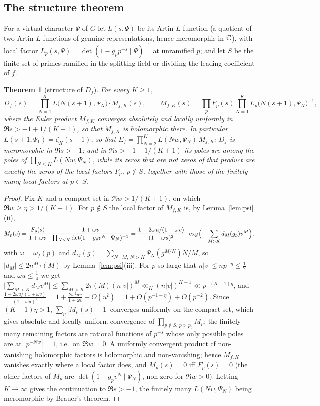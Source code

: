 \documentclass[11pt,a4paper]{article}
\newtheorem{theorem}{Theorem}
\theoremstyle{remark}\newtheorem{remark}[theorem]{Remark}
\begin{document}
\subsection{The structure theorem}

For a virtual character $\Psi$ of $G$ let $L(s,\Psi)$ be its Artin $L$-function (a quotient of two
Artin $L$-functions of genuine representations, hence meromorphic in $\mathbb{C}$), with local factor
$L_p(s,\Psi)=\det(1-g_pp^{-s}\mid\Psi)^{-1}$ at unramified $p$; and let $S$ be the finite set of primes
ramified in the splitting field or dividing the leading coefficient of $f$.

\begin{theorem}[structure of $D_f$]\label{thm:structure}
For every $K\ge1$,
\begin{equation}\label{eq:structure}
D_f(s)=\prod_{N=1}^{K}L\bigl(N(s+1),\Psi_N\bigr)\cdot M_{f,K}(s),\qquad
M_{f,K}(s)=\prod_pF_p(s)\prod_{N=1}^{K}L_p\bigl(N(s+1),\Psi_N\bigr)^{-1},
\end{equation}
where the Euler product $M_{f,K}$ converges absolutely and locally uniformly in $\Re s>-1+1/(K+1)$, so
that $M_{f,K}$ is holomorphic there. In particular $L(s+1,\Psi_1)=\zeta_K(s+1)$, so that
$E_f=\prod_{N=2}^KL(Nw,\Psi_N)\,M_{f,K}$; $D_f$ is meromorphic in $\Re s>-1$; and in
$\Re s>-1+1/(K+1)$ its poles are among the poles of $\prod_{N\le K}L(Nw,\Psi_N)$, while its zeros that are not
zeros of that product are exactly the zeros of the local factors $F_p$, $p\notin S$, together with those
of the finitely many local factors at $p\in S$.
\end{theorem}
\begin{proof}
Fix $K$ and a compact set in $\Re w>1/(K+1)$, on which $\Re w\ge\eta>1/(K+1)$. For $p\notin S$ the local
factor of $M_{f,K}$ is, by Lemma~\ref{lem:psi}(ii),
\[
M_p(s)=\frac{F_p(s)}{1+\omega v}\cdot\frac{1+\omega v}{\prod_{N\le K}\det(1-g_pv^N\mid\Psi_N)^{-1}}
=\frac{1-2\omega u/(1+\omega v)}{(1-\omega u)^2}\cdot\exp\Bigl(-\sum_{M>K}d_M(g_p)v^M\Bigr),
\]
with $\omega=\omega_f(p)$ and $d_M(g)=\sum_{N\mid M,\ N>K}\Psi_N(g^{M/N})N/M$, so $|d_M|\le2n^M\tau(M)$ by
Lemma~\ref{lem:psi}(iii). For $p$ so large that $n|v|\le n p^{-\eta}\le\tfrac12$ and $\omega u\le\tfrac14$
we get $\bigl|\sum_{M>K}d_Mv^M\bigr|\le\sum_{M>K}2\tau(M)(n|v|)^M\ll_K(n|v|)^{K+1}\ll p^{-(K+1)\eta}$, and
$\frac{1-2\omega u/(1+\omega v)}{(1-\omega u)^2}=1+\frac{2\omega^2uv}{1+\omega v}+O(u^2)=1+O(p^{-1-\eta})+O(p^{-2})$.
Since $(K+1)\eta>1$, $\sum_p|M_p(s)-1|$ converges uniformly on the compact set, which gives absolute and
locally uniform convergence of $\prod_{p\notin S,\,p>p_0}M_p$; the finitely many remaining factors are
rational functions of $p^{-s}$ whose only possible poles are at $|p^{-Nw}|=1$, i.e.\ on $\Re w=0$. A
uniformly convergent product of non-vanishing holomorphic factors is holomorphic and non-vanishing; hence
$M_{f,K}$ vanishes exactly where a local factor does, and $M_p(s)=0$ iff $F_p(s)=0$ (the other factors of
$M_p$ are $\det(1-g_pv^N\mid\Psi_N)$, non-zero for $\Re w>0$). Letting $K\to\infty$ gives the
continuation to $\Re s>-1$, the finitely many $L(Nw,\Psi_N)$ being meromorphic by Brauer's theorem.
\end{proof}
\end{document}
